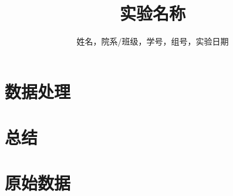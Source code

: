 \documentclass[12pt,a4paper]{ctexart}
\title{实验名称}
\author{姓名，院系/班级，学号，组号，实验日期}
\date{}
\begin{document}
\maketitle

\section*{数据处理}



\section*{总结}


\section*{原始数据}

\end{document}
